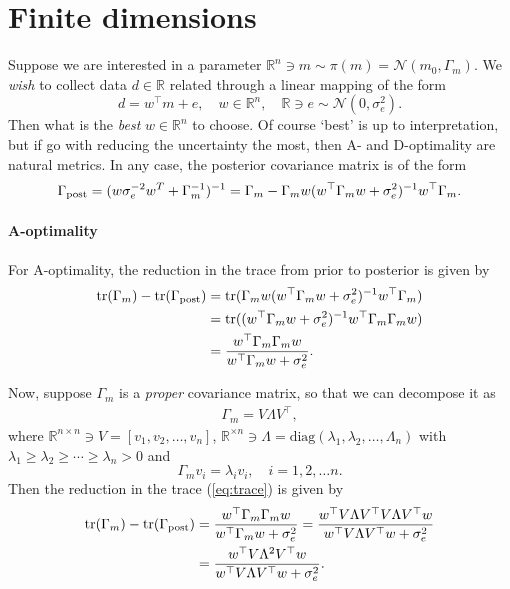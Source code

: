 \documentclass[pdflatex,sn-mathphys-num]{sn-jnl}
\theoremstyle{thmstyleone}%
\theoremstyle{thmstyletwo}%
\theoremstyle{thmstylethree}%
\begin{document}
\section{Finite dimensions}
Suppose we are interested in a parameter $\mathbb{R}^n\ni m\sim\pi(m)=\mathcal{N}(m_0,\Gamma_m)$. We {\em wish} to collect data $d\in\mathbb{R}$ related through a linear mapping of the form
\[d=w^\top m+e,\quad w\in\mathbb{R}^n,\quad \mathbb{R}\ni e\sim\mathcal{N}(0,\sigma_e^2).\]
Then what is the {\em best} $w\in\mathbb{R}^n$ to choose. Of course `best' is up to interpretation, but if go with reducing the uncertainty the most, then A- and D-optimality are natural metrics. In any case, the posterior covariance matrix is of the form
\begin{align}
   \Gamma_{\rm post}=(w\sigma_e^{-2}w^T+\Gamma_m^{-1})^{-1}=\Gamma_m-\Gamma_m w(w^\top\Gamma_m w+\sigma_e^2)^{-1}w^\top\Gamma_m.\label{eq:post} 
\end{align}


\paragraph{A-optimality}
For A-optimality, the reduction in the trace from prior to posterior is given by
\begin{align}
    \text{tr}(\Gamma_m)-\text{tr}(\Gamma_{\rm post})&=\text{tr}(\Gamma_m w(w^\top\Gamma_m w+\sigma_e^2)^{-1}w^\top\Gamma_m)\nonumber\\
    &=\text{tr}((w^\top\Gamma_m w+\sigma_e^2)^{-1}w^\top\Gamma_m\Gamma_m w)\nonumber\\
    &=\frac{w^\top\Gamma_m\Gamma_m w}{w^\top\Gamma_m w+\sigma_e^2}.\label{eq:trace}
\end{align}



Now, suppose $\Gamma_m$ is a {\em proper} covariance matrix, so that we can decompose it as
\begin{align}
    \Gamma_m=V\Lambda V^\top, \label{eq:PCA}
\end{align}
where $\mathbb{R}^{n \times n}\ni V=[v_1,v_2,\dots,v_n]$, $\mathbb{R}^{\times n}\ni\Lambda=\text{diag}(\lambda_1,\lambda_2,\dots,\Lambda_n)$ with  $\lambda_1\geq\lambda_2\geq\cdots\geq\lambda_n>0$ and
\[\Gamma_m v_i=\lambda_i v_i,\quad i=1,2,\dots n.\]
Then the reduction in the trace (\ref{eq:trace}) is given by
\begin{align}
    \text{tr}(\Gamma_m)-\text{tr}(\Gamma_{\rm post})&=\frac{w^\top\Gamma_m\Gamma_m w}{w^\top\Gamma_m w+\sigma_e^2}=\frac{w^\top V\Lambda V^\top V\Lambda V^\top w}{w^\top V\Lambda V^\top w+\sigma_e^2}\nonumber\\
    &=\frac{w^\top V\Lambda^2 V^\top w}{w^\top V\Lambda V^\top w+\sigma_e^2}.\label{eq:trace2}
\end{align}
\end{document}
